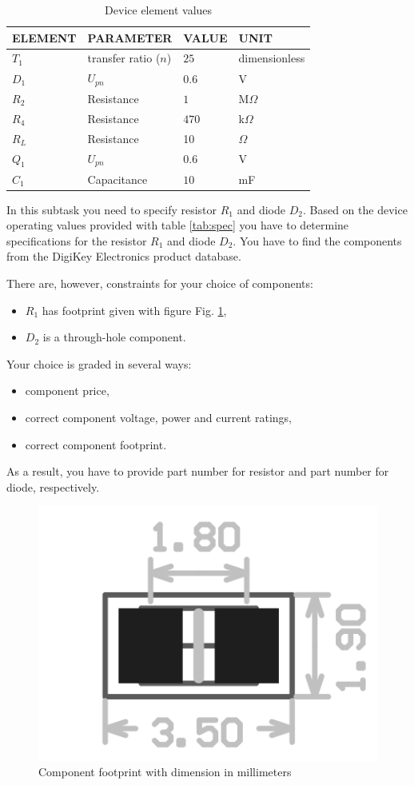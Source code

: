 \documentclass[openany]{book}
\begin{document}
	\begin{table}[h!]
		\caption{Device element values}
		\label{tab:elems}
		\begin{tabularx}{\linewidth}{|X|X|X|X|} \hline
			ELEMENT & PARAMETER & VALUE & UNIT \\ \hline
			$T_1$ & transfer ratio ($n$) & $25$ &  dimensionless \\ \hline
			$D_1$ & $U_{pn}$ & $0.6$ & V \\ \hline 
			$R_2$ & Resistance & $1$ & M$\Omega$ \\ \hline
			$R_4$ & Resistance & $470$ & k$\Omega$ \\ \hline
			$R_L$ & Resistance & 10 & $\Omega$ \\ \hline
			$Q_1$ & $U_{pn}$ & $0.6$ & V \\ \hline
			$C_1$ & Capacitance & $10$ & mF \\ \hline
		\end{tabularx}
	\end{table}
	In this subtask you need to specify resistor $R_1$ and diode $D_2$. Based 
	on 
	the device operating values provided with table \ref{tab:spec} you have to 
	determine specifications for the resistor $R_1$ and diode $D_2$. You have 
	to 
	find the components from the DigiKey Electronics product database. 
	
	There are, however, constraints for your choice of components:
	\begin{itemize}
		\item $R_1$ has footprint given with figure Fig. \ref{fig:footprint},
		\item $D_2$ is a through-hole component.
	\end{itemize} 
	
	Your choice is graded in several ways:
	\begin{itemize}
		\item component price,
		\item correct component voltage, power and current ratings,
		\item correct component footprint.
	\end{itemize}
	As a result, you have to provide part number for resistor and part number 
	for
	diode, respectively.
	
	\begin{figure}[h!]
		\centering
		\includegraphics[width=0.5\linewidth]{footprint.png}
		\caption{Component footprint with dimension in millimeters}
		\label{fig:footprint}
	\end{figure}
	
\end{document}
